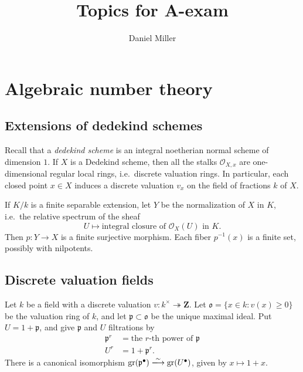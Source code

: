 \documentclass{article}
\title{Topics for A-exam}
\author{Daniel Miller}
\DeclareMathOperator{\graded}{gr}
\newcommand{\dZ}{\mathbf{Z}}
\newcommand{\fp}{\mathfrak{p}}
\newcommand{\fo}{\mathfrak{o}}
\newcommand{\sO}{\mathscr{O}}
\newcommand{\isomorphism}{\xlongrightarrow{\sim}}
\theoremstyle{definition}
\begin{document}
\maketitle
\tableofcontents










\section{Algebraic number theory}





\subsection{Extensions of dedekind schemes}

Recall that a \emph{dedekind scheme} is an integral noetherian normal scheme 
of dimension $1$. If $X$ is a Dedekind scheme, then all the stalks 
$\sO_{X,x}$ are one-dimensional regular local rings, i.e.\ discrete valuation 
rings. In particular, each closed point $x\in X$ induces a discrete valuation 
$v_x$ on the field of fractions $k$ of $X$. 

If $K/k$ is a finite separable extension, let $Y$ be the normalization of $X$ 
in $K$, i.e.\ the relative spectrum of the sheaf 
\[
  U\mapsto \text{integral closure of $\sO_X(U)$ in $K$} .
\]
Then $p:Y\to X$ is a finite surjective morphism. Each fiber $p^{-1}(x)$ is a 
finite set, possibly with nilpotents. 





\subsection{Discrete valuation fields}

Let $k$ be a field with a discrete valuation 
$v:k^\times \twoheadrightarrow \dZ$. Let $\fo=\{x\in k:v(x)\geqslant 0\}$ be 
the valuation ring of $k$, and let $\fp\subset \fo$ be the unique maximal 
ideal. Put $U=1+\fp$, and give $\fp$ and $U$ filtrations by 
\begin{align*}
  \fp^r &= \text{the $r$-th power of $\fp$} \\
  U^r &= 1+\fp^r .
\end{align*}
There is a canonical isomorphism 
$\graded(\fp^\bullet) \isomorphism \graded(U^\bullet)$, given by 
$x\mapsto 1+x$. 
\end{document}
